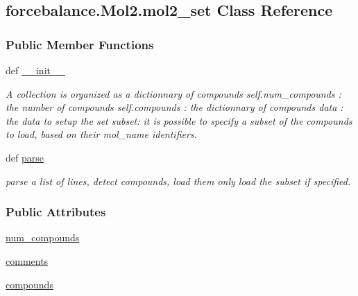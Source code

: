 \hypertarget{classforcebalance_1_1Mol2_1_1mol2__set}{\subsection{forcebalance.\-Mol2.\-mol2\-\_\-set \-Class \-Reference}
\label{classforcebalance_1_1Mol2_1_1mol2__set}
}
\subsubsection*{\-Public \-Member \-Functions}
\begin{DoxyCompactItemize}
\item 
def \hyperlink{classforcebalance_1_1Mol2_1_1mol2__set_a206a3129cfa4ef6fb5982bbe536ffef9}{\-\_\-\-\_\-init\-\_\-\-\_\-}
\begin{DoxyCompactList}\small\item\em \-A collection is organized as a dictionnary of compounds self.\-num\-\_\-compounds \-: the number of compounds self.\-compounds \-: the dictionnary of compounds data \-: the data to setup the set subset\-: it is possible to specify a subset of the compounds to load, based on their mol\-\_\-name identifiers. \end{DoxyCompactList}\item 
def \hyperlink{classforcebalance_1_1Mol2_1_1mol2__set_ada065630fbb80124e21e04a1622c9c74}{parse}
\begin{DoxyCompactList}\small\item\em parse a list of lines, detect compounds, load them only load the subset if specified. \end{DoxyCompactList}\end{DoxyCompactItemize}
\subsubsection*{\-Public \-Attributes}
\begin{DoxyCompactItemize}
\item 
\hyperlink{classforcebalance_1_1Mol2_1_1mol2__set_a5d75e29483932c00c5f2c93a5f9406ba}{num\-\_\-compounds}
\item 
\hyperlink{classforcebalance_1_1Mol2_1_1mol2__set_a796ca64cd0221863599ae8ec8cf306cb}{comments}
\item 
\hyperlink{classforcebalance_1_1Mol2_1_1mol2__set_a8f6f74cef966e8862548505600451c15}{compounds}
\end{DoxyCompactItemize}


